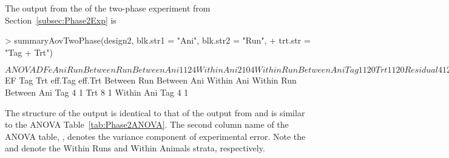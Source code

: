 \documentclass[article]{jss}
\begin{document}
The output from the  of the two-phase experiment from Section~\ref{subsec:Phase2Exp} is
\begin{CodeChunk}
\begin{CodeInput}
> summaryAovTwoPhase(design2, blk.str1 = "Ani", blk.str2 = "Run", 
+ trt.str = "Tag + Trt")                                      
\end{CodeInput}
\begin{CodeOutput}
$ANOVA
               DF e Ani Run
Between Run                
   Between Ani 1  1 2   4  
   Within Ani  2  1 0   4  
Within Run                 
   Between Ani             
      Tag      1  1 2   0  
      Trt      1  1 2   0  
      Residual 4  1 2   0  
   Within Ani              
      Tag      2  1 0   0  
      Residual 4  1 0   0  
$EF
               Tag Trt eff.Tag eff.Trt
Between Run                           
   Between Ani                        
   Within Ani                         
Within Run                            
   Between Ani                        
      Tag      4       1              
      Trt          8           1      
   Within Ani                         
      Tag      4       1              
\end{CodeOutput}
\end{CodeChunk}
The structure of the output is identical to that of the output from  and is similar to the ANOVA Table~\ref{tab:Phase2ANOVA}. The second column name of the ANOVA table, , denotes the variance component of experimental error. Note the  and  denote the Within Runs and Within Animals strata, respectively. 
\end{document}
